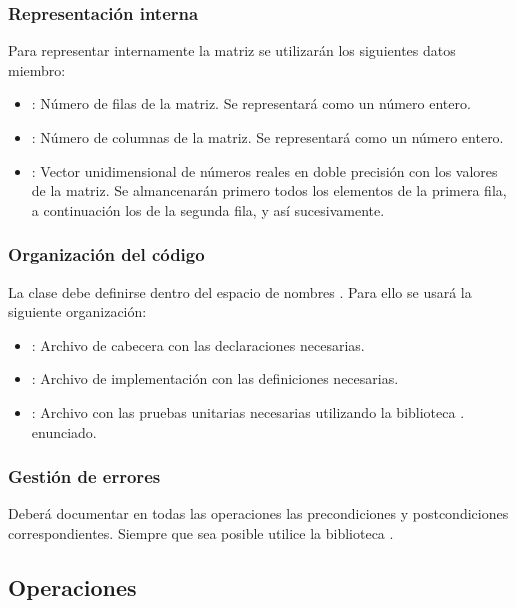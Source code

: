\subsubsection{Representación interna}

Para representar internamente la matriz se utilizarán los siguientes datos
miembro:

\begin{itemize}
  \item {}: Número de filas de la matriz. Se representará como un
número entero.
  \item {}: Número de columnas de la matriz. Se representará
como un número entero.
  \item {}: Vector unidimensional de números reales en doble
precisión con los valores de la matriz. Se almancenarán primero todos los
elementos de la primera fila, a continuación los de la segunda fila, y así
sucesivamente.  
\end{itemize}

\subsubsection{Organización del código}

La clase  debe definirse dentro del espacio de nombres
. Para ello se usará la siguiente organización:

\begin{itemize}
  \item {}: Archivo de cabecera con las declaraciones
necesarias.
  \item {}: Archivo de implementación con las definiciones
necesarias.
  \item {}: Archivo con las pruebas unitarias necesarias
utilizando la biblioteca .
enunciado.
\end{itemize}

\subsubsection{Gestión de errores}

Deberá documentar en todas las operaciones las precondiciones y postcondiciones
correspondientes. Siempre que sea posible utilice la biblioteca
.

\subsection{Operaciones}

